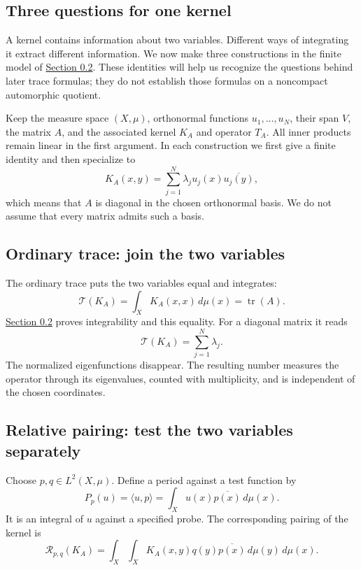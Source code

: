 \subsection{Three questions for one kernel}\label{three-finite-kernel-constructions}

A kernel contains information about two variables. Different ways of integrating it extract different information. We now make three constructions in the finite model of \hyperref[v1a-ch00-s2]{Section 0.2}. These identities will help us recognize the questions behind later trace formulas; they do not establish those formulas on a noncompact automorphic quotient.

Keep the measure space \((X,\mu)\), orthonormal functions \(u_1,\ldots,u_N\), their span \(V\), the matrix \(A\), and the associated kernel \(K_A\) and operator \(T_A\). All inner products remain linear in the first argument. In each construction we first give a finite identity and then specialize to
\[
K_A(x,y)=\sum_{j=1}^N\lambda_j u_j(x)\overline{u_j(y)},
\]
which means that \(A\) is diagonal in the chosen orthonormal basis. We do not assume that every matrix admits such a basis.

\subsection{Ordinary trace: join the two variables}\label{ordinary-finite-trace}

The ordinary trace puts the two variables equal and integrates:
\[
\mathcal T(K_A)=\int_X K_A(x,x)\,d\mu(x)
=\operatorname{tr}(A).
\]
\hyperref[v1a-ch00-s2]{Section 0.2} proves integrability and this equality. For a diagonal matrix it reads
\[
\mathcal T(K_A)=\sum_{j=1}^N\lambda_j.
\]
The normalized eigenfunctions disappear. The resulting number measures the operator through its eigenvalues, counted with multiplicity, and is independent of the chosen coordinates.

\subsection{Relative pairing: test the two variables separately}\label{relative-finite-pairing}

Choose \(p,q\in L^2(X,\mu)\). Define a period against a test function by
\[
P_p(u)=\langle u,p\rangle
=\int_X u(x)\overline{p(x)}\,d\mu(x).
\]
It is an integral of \(u\) against a specified probe. The corresponding pairing of the kernel is
\[
\mathcal R_{p,q}(K_A)
=\int_X\int_X K_A(x,y)q(y)\overline{p(x)}\,d\mu(y)\,d\mu(x).
\]

